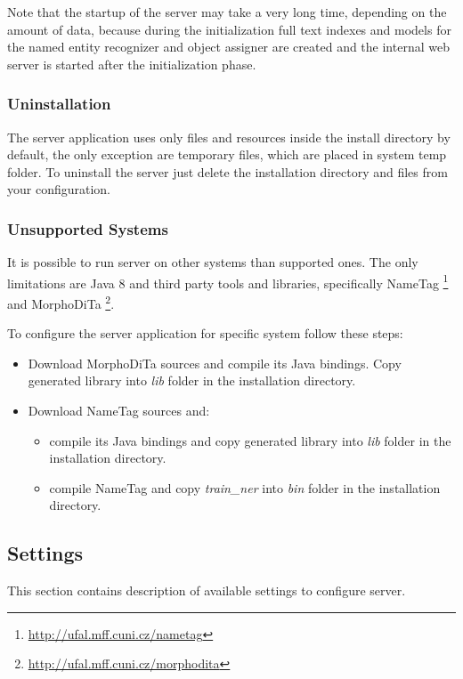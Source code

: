 Note that the startup of the server may take a very long time, depending on the
amount of data, because during the initialization full text indexes
and models for the named entity recognizer and object assigner are created and
the internal web server is started after the initialization phase.

\subsubsection{Uninstallation}
The server application uses only files and resources inside the install
directory by default, the only exception are temporary files, which are placed
in system temp folder. To uninstall the server just delete the installation directory and files from your configuration.

\subsubsection{Unsupported Systems}
\label{sssec:unsupport}
It is possible to run \textan{} server on other systems than supported ones.
The only limitations are Java 8 and third party tools and libraries,
specifically NameTag%
\footnote{\url{http://ufal.mff.cuni.cz/nametag}} and MorphoDiTa%
\footnote{\url{http://ufal.mff.cuni.cz/morphodita}}.

To configure the server application for specific system follow these steps:
\begin{itemize}
\item Download MorphoDiTa sources and compile its Java bindings. Copy generated
library into \emph{lib} folder in the installation directory.
\item Download NameTag sources and:
	\begin{itemize}
	\item compile its Java bindings and copy generated library into \emph{lib}
	folder in the installation directory.
	\item compile NameTag and copy \emph{train\_ner} into \emph{bin} folder in
	the installation directory.
	\end{itemize}
\end{itemize}

\subsection{Settings}
\label{sec:ServerSettings}

This section contains description of available settings to configure \textan{}
server.

